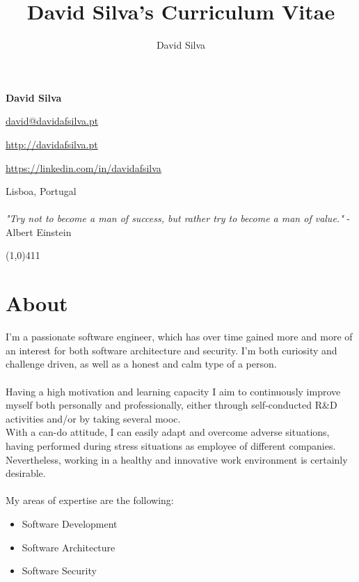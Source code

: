 \documentclass[10pt]{article}
\title{David Silva's Curriculum Vitae}
\author{David Silva}
\newenvironment{listing}{
 \begin{itemize}
  \setlength{\itemsep}{1pt}
  \setlength{\parskip}{0pt}
  \setlength{\parsep}{0pt}
}{\end{itemize}}
\begin{document}
\pagestyle{fancy}
	
\begin{minipage}[ht]{0.46\textwidth}
	\vspace{-5mm}\Huge{\textbf{David Silva}}
\end{minipage}
\begin{minipage}[ht]{0.46\textwidth}
\hfill \href{mailto:david@davidafsilva.pt}{david@davidafsilva.pt}

\hfill \url{http://davidafsilva.pt}

\hfill \url{https://linkedin.com/in/davidafsilva}
\end{minipage}

\begin{minipage}[ht]{0.925\textwidth}
\vspace{-3mm} Lisboa, Portugal\\\\
\vspace{0 mm} \hfill\footnotesize{
    \textit{"Try not to become a man of success, but rather try to become a man of value."} - Albert Einstein
}
\vspace{0.5mm}
\end{minipage}

\line(1,0){411}

\section*{About}
I'm a passionate software engineer, which has over time gained more and more of an interest for both software architecture and security. I'm both curiosity and challenge driven, as well as a honest and calm type of a person.\\\\
Having a high motivation and learning capacity I aim to continuously improve myself both personally and professionally, either through self-conducted R\&D activities and/or by taking several \gls{mooc}. \\
With a can-do attitude, I can easily adapt and overcome adverse situations, having performed during stress situations as employee of different companies.
Nevertheless, working in a healthy and innovative work environment is certainly desirable.\\\\
My areas of expertise are the following:
\begin{listing}
	\item Software Development
	\item Software Architecture
	\item Software Security
\end{listing}
\end{document}
